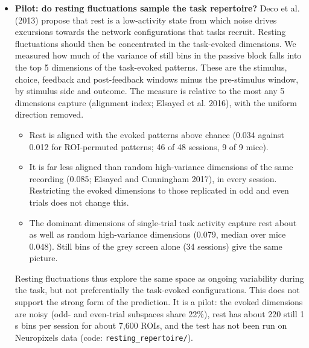 \documentclass[10pt,a4paper]{article}
\begin{document}
\begin{itemize}
\begin{itemize}
\item Section 10.3's other two comparisons are not possible here. The task has no still bins outside the stimulus-to-feedback windows (median 0 per session), and the wheel is not recorded in the passive block, so face and wheel movements cannot be separated.
\end{itemize}
\item \textbf{Pilot: do resting fluctuations sample the task repertoire?} Deco et al. (2013) propose that rest is a low-activity state from which noise drives excursions towards the network configurations that tasks recruit. Resting fluctuations should then be concentrated in the task-evoked dimensions. We measured how much of the variance of still bins in the passive block falls into the top 5 dimensions of the task-evoked patterns. These are the stimulus, choice, feedback and post-feedback windows minus the pre-stimulus window, by stimulus side and outcome. The measure is relative to the most any 5 dimensions capture (alignment index; Elsayed et al. 2016), with the uniform direction removed. 
\begin{itemize}
\item Rest is aligned with the evoked patterns above chance (0.034 against 0.012 for ROI-permuted patterns; 46 of 48 sessions, 9 of 9 mice).
\item It is far less aligned than random high-variance dimensions of the same recording (0.085; Elsayed and Cunningham 2017), in every session. Restricting the evoked dimensions to those replicated in odd and even trials does not change this.
\item The dominant dimensions of single-trial task activity capture rest about as well as random high-variance dimensions (0.079, median over mice 0.048). Still bins of the grey screen alone (34 sessions) give the same picture.
\end{itemize}
 Resting fluctuations thus explore the same space as ongoing variability during the task, but not preferentially the task-evoked configurations. This does not support the strong form of the prediction. It is a pilot: the evoked dimensions are noisy (odd- and even-trial subspaces share 22\%), rest has about 220 still 1 s bins per session for about 7,600 ROIs, and the test has not been run on Neuropixels data (code: \texttt{resting\_\allowbreak{}repertoire/\allowbreak{}}).
\end{itemize}
\end{document}
